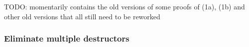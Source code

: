 \documentclass[11pt]{article} %
\begin{document}
TODO: momentarily contains the old versions of some proofs of (1a), (1b) and other old versions that all still need to be reworked

\subsubsection{Eliminate multiple destructors}

%
%
%
%
%
%
%
%
%
\end{document}
